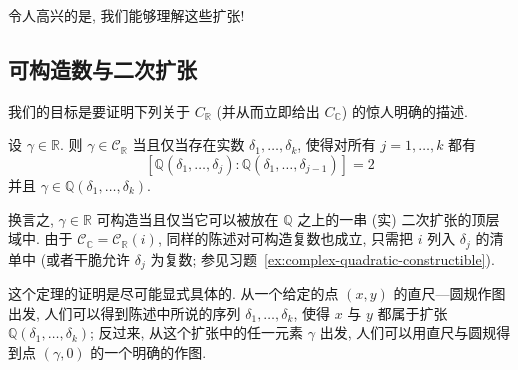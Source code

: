 令人高兴的是, 我们能够理解这些扩张!

\subsection{可构造数与二次扩张}
\label{subsec:constructible-quadratic}

我们的目标是要证明下列关于 $C_{\mathbb{R}}$ (并从而立即给出 $C_{\mathbb{C}}$) 的惊人明确的描述.

\begin{theorem}\label{thm:constructible-quadratic}
设 $\gamma\in\mathbb{R}$. 则 $\gamma\in\mathcal{C}_{\mathbb{R}}$ 当且仅当存在实数 $\delta_1,\ldots,\delta_k$, 使得对所有 $j=1,\ldots,k$ 都有
\[
[\mathbb{Q}(\delta_1,\ldots,\delta_j):\mathbb{Q}(\delta_1,\ldots,\delta_{j-1})]=2
\]
并且 $\gamma\in\mathbb{Q}(\delta_1,\ldots,\delta_k)$.
\end{theorem}

换言之, $\gamma\in\mathbb{R}$ 可构造当且仅当它可以被放在 $\mathbb{Q}$ 之上的一串 (实) 二次扩张的顶层域中. 由于 $\mathcal{C}_{\mathbb{C}}=\mathcal{C}_{\mathbb{R}}(i)$, 同样的陈述对可构造复数也成立, 只需把 $i$ 列入 $\delta_j$ 的清单中 (或者干脆允许 $\delta_j$ 为复数; 参见习题~\ref{ex:complex-quadratic-constructible}).

这个定理的证明是尽可能显式具体的. 从一个给定的点 $(x,y)$ 的直尺—圆规作图出发, 人们可以得到陈述中所说的序列 $\delta_1,\ldots,\delta_k$, 使得 $x$ 与 $y$ 都属于扩张 $\mathbb{Q}(\delta_1,\ldots,\delta_k)$; 反过来, 从这个扩张中的任一元素 $\gamma$ 出发, 人们可以用直尺与圆规得到点 $(\gamma,0)$ 的一个明确的作图.

